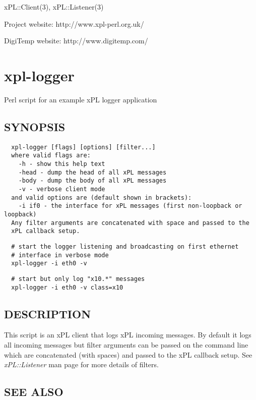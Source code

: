 xPL::Client(3), xPL::Listener(3)



Project website: http://www.xpl-perl.org.uk/



DigiTemp website: http://www.digitemp.com/

\section{xpl-logger\label{xpl-logger}}


Perl script for an example xPL logger application

\subsection*{SYNOPSIS\label{xpl-logger_SYNOPSIS}}
\begin{verbatim}
  xpl-logger [flags] [options] [filter...]
  where valid flags are:
    -h - show this help text
    -head - dump the head of all xPL messages
    -body - dump the body of all xPL messages
    -v - verbose client mode
  and valid options are (default shown in brackets):
    -i if0 - the interface for xPL messages (first non-loopback or loopback)
  Any filter arguments are concatenated with space and passed to the
  xPL callback setup.
\end{verbatim}
\begin{verbatim}
  # start the logger listening and broadcasting on first ethernet
  # interface in verbose mode
  xpl-logger -i eth0 -v
\end{verbatim}
\begin{verbatim}
  # start but only log "x10.*" messages
  xpl-logger -i eth0 -v class=x10
\end{verbatim}
\subsection*{DESCRIPTION\label{xpl-logger_DESCRIPTION}}


This script is an xPL client that logs xPL incoming messages.  By
default it logs all incoming messages but filter arguments can be
passed on the command line which are concatenated (with spaces) and
passed to the xPL callback setup.  See \emph{xPL::Listener} man page for
more details of filters.

\subsection*{SEE ALSO\label{xpl-logger_SEE_ALSO}}


